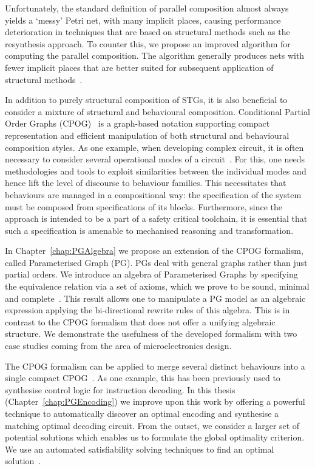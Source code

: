 Unfortunately, the standard definition of parallel composition almost always yields a `messy' Petri net, with many implicit places, causing performance deterioration in techniques that are based on structural methods such as the resynthesis approach. To counter this, we propose an improved algorithm for computing the parallel composition. The algorithm generally produces nets with fewer implicit places that are better suited for subsequent application of structural methods~\cite{improved_par_comp}.

In addition to purely structural composition of STGs, it is also beneficial to consider a mixture of 
structural and behavioural composition. Conditional Partial Order Graphs (CPOG)~\cite{2009_mokhov_phd} is a graph-based notation supporting compact
representation and efficient manipulation of both structural and behavioural composition styles. As one example, when developing complex circuit, it is
often necessary to consider several operational modes of a circuit~\cite{2012_xia_iet,2012_mokhov_async}.
For this, one needs methodologies and tools to exploit similarities between
the individual modes and hence lift the level of discourse to behaviour families.
This necessitates that behaviours are managed in a compositional
way: the specification of the system must be composed from specifications
of its blocks. Furthermore, since the approach is intended to be a part of a safety critical toolchain, it is essential that such a  specification is amenable to mechanised reasoning and transformation.

In Chapter~\ref{chap:PGAlgebra} we propose an extension of the CPOG formalism, called Parameterised Graph (PG).
PGs deal with general graphs rather than just partial orders. We introduce an algebra of Parameterised Graphs by specifying the
equivalence relation via a set of axioms, which we prove to be sound,
minimal and complete~\cite{pg_algebra}. This result allows one to manipulate a PG model
as an algebraic expression applying the bi-directional rewrite rules of this algebra. This is  in contrast to the CPOG formalism that does not offer a unifying algebraic structure. We demonstrate
the usefulness of the developed formalism with two case studies coming
from the area of microelectronics design.

The CPOG formalism can be applied to merge several distinct behaviours
into a single compact CPOG~\cite{2009_mokhov_phd}. As one example, this has been previously used to
synthesise control logic for instruction decoding. In this thesis (Chapter~\ref{chap:PGEncoding}) 
we improve upon this work by offering a powerful technique to automatically discover an optimal encoding and
synthesise a matching optimal decoding circuit. From the outset, we consider a larger set of potential solutions
which enables us to formulate the global optimality criterion. We use an automated satisfiability solving 
techniques to find an optimal solution~\cite{cpog_encoding}.

